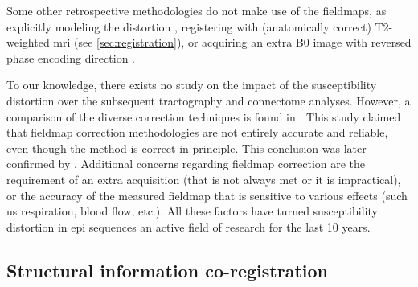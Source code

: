 Some other retrospective methodologies do not make use of the fieldmaps, 
as explicitly modeling the distortion \citep{andersson_modeling_2001},
registering with (anatomically correct) T2-weighted \gls{mri} 
\citep{kybic_unwarping_2000,studholme_accurate_2000,li_accounting_2007,
tao_variational_2009} (see \autoref{sec:registration}), or acquiring an 
extra B0 image with reversed phase encoding direction 
\citep{holland_efficient_2010}.

To our knowledge, there exists no study on 
the impact of the susceptibility distortion over the subsequent tractography 
and connectome analyses. However, a comparison of the diverse correction 
techniques is found in \citep{wu_comparison_2008}. This
study claimed that fieldmap correction methodologies are not entirely accurate
and reliable, even though the method is correct in principle. This conclusion
was later confirmed by \citep{tao_variational_2009}. Additional concerns regarding
fieldmap correction are the requirement of an extra acquisition (that is not always
met or it is impractical), or the accuracy of the measured fieldmap that is sensitive
to various effects (such us respiration, blood flow, etc.). All these factors 
have turned susceptibility distortion in \gls{epi} sequences an active field of 
research for the last 10 years.


\subsection{Structural information co-registration}
\label{sec:registration}

